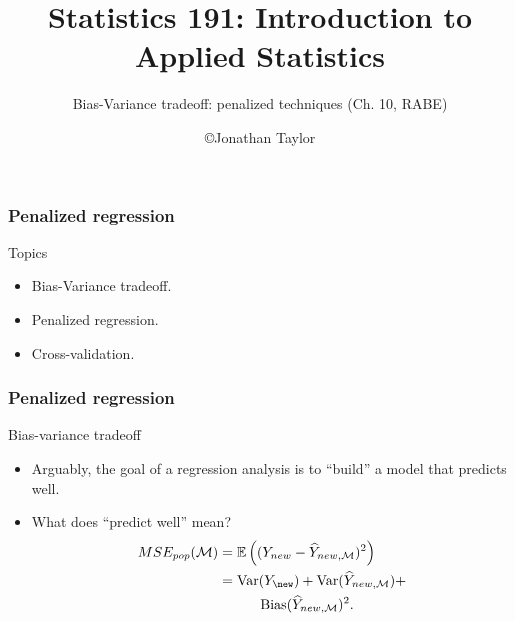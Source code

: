 \documentclass[handout]{beamer}
\title{Statistics 191: Introduction to Applied Statistics}
\subtitle{Bias-Variance tradeoff: penalized techniques (Ch. 10, RABE)}
\author{\copyright Jonathan Taylor \\
   }
\newcommand{\V}{\text{Var}}
\newcommand{\Ee}{\mathbb{E}}
\newcommand{\model}{{\cal M}}
\begin{document}
   \begin{frame}
   \titlepage
   \end{frame}


   \begin{frame} \frametitle{Penalized regression}

   \begin{block} {Topics}
     \begin{itemize}

     \item Bias-Variance tradeoff.
   \item Penalized regression.
     \item Cross-validation.

   \end{itemize}

   \end{block}
   \end{frame}


   \begin{frame} \frametitle{Penalized regression}

   \begin{block}
   {Bias-variance tradeoff                     }
       \begin{itemize}

       \item Arguably, the goal of a regression analysis
   is to ``build'' a model that predicts well.

   \item What does ``predict well'' mean?
   $$
   \begin{aligned}
   MSE_{pop}(\model) &= \Ee \left((Y_{new} - \widehat{Y}_{new,{\cal M}})^2\right) \\
   &=
   \V(Y_{\new}) + \V(\widehat{Y}_{new,{\cal M}}) +
   \\
   & \qquad \quad \text{Bias}(\widehat{Y}_{new,{\cal M}})^2.
   \end{aligned}
   $$
       \end{itemize}
   \end{block}
   \end{frame}

\end{document}
